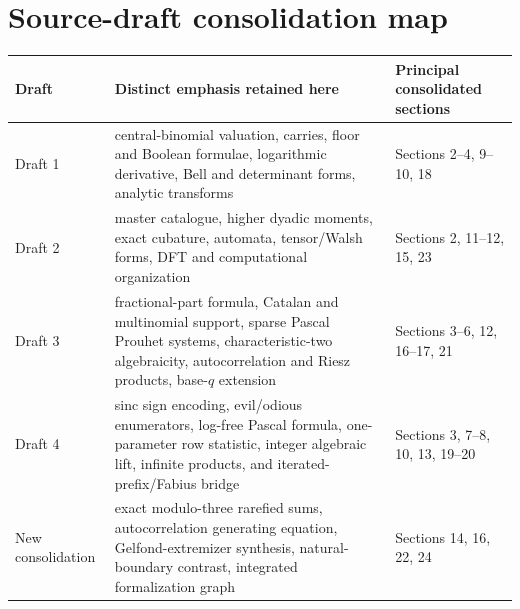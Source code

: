 \documentclass[11pt,oneside]{article}
\theoremstyle{definition}
\theoremstyle{remark}
\begin{document}
\section{Source-draft consolidation map}

\begin{longtable}{>{\raggedright\arraybackslash}p{}
                  >{\raggedright\arraybackslash}p{}
                  >{\raggedright\arraybackslash}p{}}
\toprule
Draft & Distinct emphasis retained here & Principal consolidated sections \\
\midrule
\endhead
Draft 1 & central-binomial valuation, carries, floor and Boolean formulae,
logarithmic derivative, Bell and determinant forms, analytic transforms &
Sections 2--4, 9--10, 18 \\
Draft 2 & master catalogue, higher dyadic moments, exact cubature, automata,
tensor/Walsh forms, DFT and computational organization &
Sections 2, 11--12, 15, 23 \\
Draft 3 & fractional-part formula, Catalan and multinomial support, sparse
Pascal Prouhet systems, characteristic-two algebraicity, autocorrelation and
Riesz products, base-$q$ extension &
Sections 3--6, 12, 16--17, 21 \\
Draft 4 & sinc sign encoding, evil/odious enumerators, log-free Pascal formula,
one-parameter row statistic, integer algebraic lift, infinite products, and
iterated-prefix/Fabius bridge &
Sections 3, 7--8, 10, 13, 19--20 \\
New consolidation & exact modulo-three rarefied sums, autocorrelation generating
equation, Gelfond-extremizer synthesis, natural-boundary contrast, integrated
formalization graph &
Sections 14, 16, 22, 24 \\
\bottomrule
\end{longtable}
\end{document}
